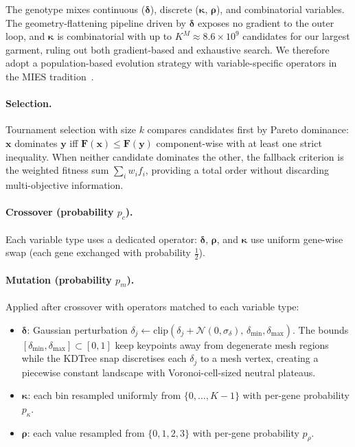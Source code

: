 The genotype mixes continuous ($\boldsymbol{\delta}$), discrete
($\boldsymbol{\kappa}$, $\boldsymbol{\rho}$), and combinatorial variables.
The geometry-flattening pipeline driven by $\boldsymbol{\delta}$ exposes
no gradient to the outer loop, and $\boldsymbol{\kappa}$ is combinatorial
with up to $K^M \approx 8.6 \times 10^9$ candidates for our largest
garment, ruling out both gradient-based and exhaustive search.
We therefore adopt a population-based evolution strategy with
variable-specific operators in the MIES
tradition~\cite{LiEEBSDR13}.

\paragraph{Selection.}
Tournament selection with size $k$ compares candidates first by Pareto
dominance: $\mathbf{x}$ dominates $\mathbf{y}$ iff
$\mathbf{F}(\mathbf{x}) \leq \mathbf{F}(\mathbf{y})$ component-wise with
at least one strict inequality.
When neither candidate dominates the other, the fallback criterion is the
weighted fitness sum $\sum_i w_i f_i$, providing a total order without
discarding multi-objective information.

\paragraph{Crossover (probability $p_c$).}
Each variable type uses a dedicated operator:
$\boldsymbol{\delta}$, $\boldsymbol{\rho}$, and $\boldsymbol{\kappa}$ use
uniform gene-wise swap (each gene exchanged with probability
$\tfrac{1}{2}$).

\paragraph{Mutation (probability $p_m$).}
Applied after crossover with operators matched to each variable type:
\begin{itemize}
    \item $\boldsymbol{\delta}$: Gaussian perturbation
          $\delta_j \leftarrow \mathrm{clip}(\delta_j + \mathcal{N}(0, \sigma_\delta),\,
          \delta_{\min}, \delta_{\max})$.
          The bounds $[\delta_{\min}, \delta_{\max}] \subset [0,1]$ keep
          keypoints away from degenerate mesh regions while the KDTree snap
          discretises each $\delta_j$ to a mesh vertex, creating a piecewise
          constant landscape with Voronoi-cell-sized neutral plateaus.
    \item $\boldsymbol{\kappa}$: each bin resampled uniformly from
          $\{0,\dots,K{-}1\}$ with per-gene probability $p_\kappa$.
    \item $\boldsymbol{\rho}$: each value resampled from $\{0,1,2,3\}$
          with per-gene probability $p_\rho$.
\end{itemize}

